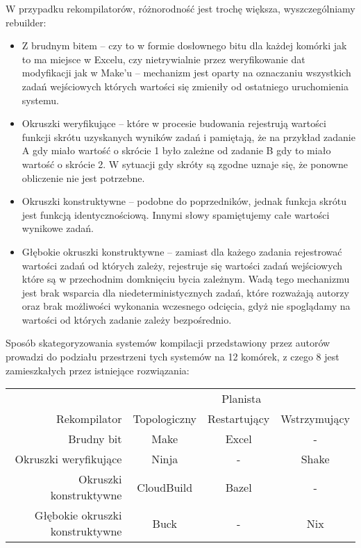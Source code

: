 W przypadku rekompilatorów, różnorodność jest trochę większa, wyszczególniamy rebuilder:
\begin{itemize}
\item Z brudnym bitem -- czy to w formie dosłownego bitu dla każdej komórki jak to ma miejsce w Excelu, czy nietrywialnie przez weryfikowanie dat modyfikacji jak w Make'u -- mechanizm jest oparty na oznaczaniu wszystkich zadań wejściowych których wartości się zmieniły od ostatniego uruchomienia systemu.
\item Okruszki weryfikujące -- które w procesie budowania rejestrują wartości funkcji skrótu uzyskanych wyników zadań i pamiętają, że na przykład zadanie A gdy miało wartość o skrócie 1 było zależne od zadanie B gdy to miało wartość o skrócie 2. W sytuacji gdy skróty są zgodne uznaje się, że ponowne obliczenie nie jest potrzebne.
\item Okruszki konstruktywne -- podobne do poprzedników, jednak funkcja skrótu jest funkcją identycznościową. Innymi słowy spamiętujemy całe wartości wynikowe zadań.
\item Głębokie okruszki konstruktywne -- zamiast dla każego zadania rejestrować wartości zadań od których zależy, rejestruje się wartości zadań wejściowych które są w przechodnim domknięciu bycia zależnym. Wadą tego mechanizmu jest brak wsparcia dla niedeterministycznych zadań, które rozważają autorzy oraz brak możliwości wykonania wczesnego odcięcia, gdyż nie spoglądamy na wartości od których zadanie zależy bezpośrednio.
\end{itemize}

Sposób skategoryzowania systemów kompilacji przedstawiony przez autorów prowadzi do podziału przestrzeni tych systemów na 12 komórek, z czego 8 jest zamieszkałych przez istniejące rozwiązania:

\begin{tabular}{r | c c c}
\hline
                                & \multicolumn{3}{c}{Planista} \\
Rekompilator                    & Topologiczny & Restartujący & Wstrzymujący \\
\hline
Brudny bit                      & Make         & Excel        & - \\
Okruszki weryfikujące           & Ninja        & -            & Shake \\
Okruszki konstruktywne          & CloudBuild   & Bazel        & -\\
Głębokie okruszki konstruktywne & Buck         & -            & Nix \\
\hline
\end{tabular}

